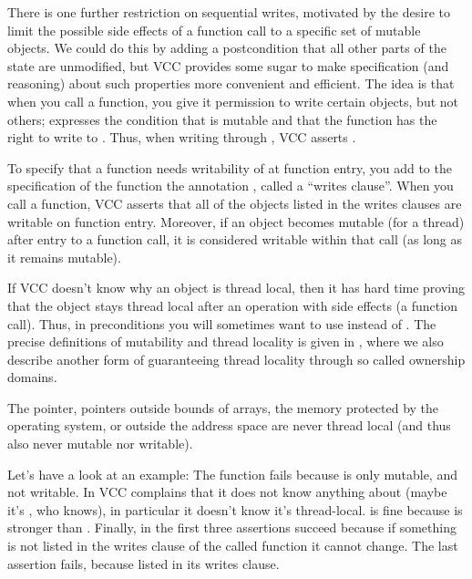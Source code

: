 There is one further restriction on sequential writes, motivated by
the desire to limit the possible side effects of a function call to a
specific set of mutable objects. We could do this by adding a
postcondition that all other parts of the state are unmodified, but
VCC provides some sugar to make specification (and reasoning) about
such properties more convenient and efficient. The idea is that when
you call a function, you give it permission to write certain objects,
but not others;  expresses the condition that
 is mutable and that the function has the right to write to
. Thus, when writing through , VCC asserts
.

To specify that a function needs writability of  at
function entry, you add to the specification of the function the
annotation , called a ``writes clause''. When 
you call a function, VCC asserts that all of the objects listed in the
writes clauses are writable on function entry.
Moreover, if an object becomes mutable (for a thread) after entry to a
function call, it is considered writable within that call (as long as
it remains mutable).


\begin{note}
If VCC doesn't know why an object is thread local, then it has
hard time proving that the object stays thread local after an operation
with side effects (\eg a function call).
Thus, in preconditions you will sometimes want to use
 instead of .
The precise definitions of mutability and thread locality
is given in ,
where we also describe another form of guaranteeing thread locality
through so called ownership domains.
\end{note}

The  pointer, pointers outside bounds of arrays,
the memory protected by the operating system, or outside
the address space are never thread local (and thus also never mutable
nor writable).

Let's have a look at an example:
\noindent
The function  fails because  is only
mutable, and not writable.
In  VCC complains that it does not know
anything about  (maybe it's , who knows),
in particular it doesn't know it's thread-local.
 is fine because \vcc{\mutable} is stronger
than .
Finally, in  the first three assertions succeed
because if something is not listed in the writes clause
of the called function it cannot change.
The last assertion fails, because  listed 
in its writes clause.

